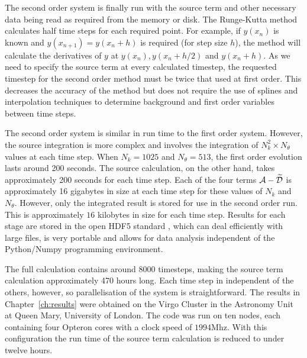 The second order system is finally run with the source term and other
necessary data being read as required from the memory or disk. The
Runge-Kutta method calculates half time steps for each required point.
For example, if $y(x_n)$ is known and $y(x_{n+1})=y(x_n+h)$ is required
(for step size $h$), the method will calculate the derivatives of $y$
at $y(x_n), y(x_n +h/2)$ and $y(x_n + h)$. As we need to specify the
source term at every calculated timestep, the requested timestep for
the second order method must be twice that used at first order.  This decreases the
accuracy of the method but does not require the use
of splines and interpolation techniques to determine background and
first order variables between time steps.


The second order system is similar in run time to the first order 
system. However, the
source integration is more complex and involves the
integration of $N_k^2\times N_\theta$ values at
each time step.
When $N_k=1025$ and $N_\theta=513$, the first order evolution lasts around 200
seconds. The source calculation, on the other hand, takes approximately 200 seconds
for each time step. Each of the four terms $\mathcal{A}-\widetilde{\mathcal{D}}$ is approximately 16 gigabytes
in size at each time step for these values of $N_k$ and $N_\theta$. However, only the
integrated result is stored for use
in the second order run. This is approximately $16$ kilobytes in size for each time
step. 
Results for each stage are stored in the open HDF5 standard
\cite{pytables, hdf5}, which can
deal efficiently with large
files, is very portable and allows for data analysis independent of the
Python/Numpy programming environment.

The full calculation contains around 8000 timesteps, making the source term
calculation approximately 470 hours long. Each time step in independent of the
others, however, so parallelisation of the system is straightforward. The results in
Chapter~\ref{ch:results} were obtained on the Virgo Cluster in the Astronomy Unit at
Queen Mary, University of London. The code was run on ten nodes, each containing
four Opteron cores with a clock speed of $1994$Mhz. With this configuration the run
time of the source term calculation is reduced to under twelve hours. 





